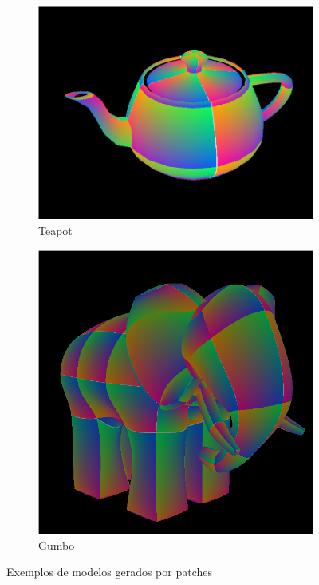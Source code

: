 \documentclass[a4paper]{article}
\begin{document}
\begin{figure}[H]
    \centering
    \begin{subfigure}{0.4\textwidth}
        \includegraphics[width=\textwidth]{./teapot.png}
        \caption{Teapot}
    \end{subfigure}
    \begin{subfigure}{0.4\textwidth}
        \includegraphics[width=\textwidth]{./gumbo.png}
        \caption{Gumbo}
    \end{subfigure}
    \caption{Exemplos de modelos gerados por patches}
\end{figure}
\end{document}
